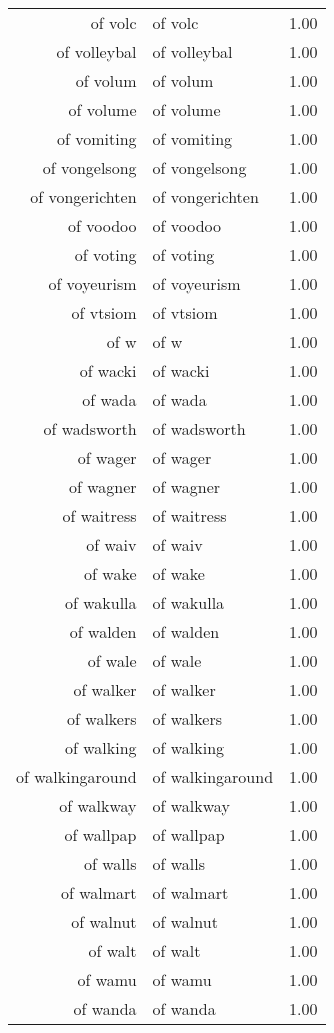 \begin{table}[ht]
\begin{tabular}{rlr}
  of volc & of volc & 1.00 \\ 
  of volleybal & of volleybal & 1.00 \\ 
  of volum & of volum & 1.00 \\ 
  of volume & of volume & 1.00 \\ 
  of vomiting & of vomiting & 1.00 \\ 
  of vongelsong & of vongelsong & 1.00 \\ 
  of vongerichten & of vongerichten & 1.00 \\ 
  of voodoo & of voodoo & 1.00 \\ 
  of voting & of voting & 1.00 \\ 
  of voyeurism & of voyeurism & 1.00 \\ 
  of vtsiom & of vtsiom & 1.00 \\ 
  of w & of w & 1.00 \\ 
  of wacki & of wacki & 1.00 \\ 
  of wada & of wada & 1.00 \\ 
  of wadsworth & of wadsworth & 1.00 \\ 
  of wager & of wager & 1.00 \\ 
  of wagner & of wagner & 1.00 \\ 
  of waitress & of waitress & 1.00 \\ 
  of waiv & of waiv & 1.00 \\ 
  of wake & of wake & 1.00 \\ 
  of wakulla & of wakulla & 1.00 \\ 
  of walden & of walden & 1.00 \\ 
  of wale & of wale & 1.00 \\ 
  of walker & of walker & 1.00 \\ 
  of walkers & of walkers & 1.00 \\ 
  of walking & of walking & 1.00 \\ 
  of walkingaround & of walkingaround & 1.00 \\ 
  of walkway & of walkway & 1.00 \\ 
  of wallpap & of wallpap & 1.00 \\ 
  of walls & of walls & 1.00 \\ 
  of walmart & of walmart & 1.00 \\ 
  of walnut & of walnut & 1.00 \\ 
  of walt & of walt & 1.00 \\ 
  of wamu & of wamu & 1.00 \\ 
  of wanda & of wanda & 1.00 \\ 

\end{tabular}
\end{table}
